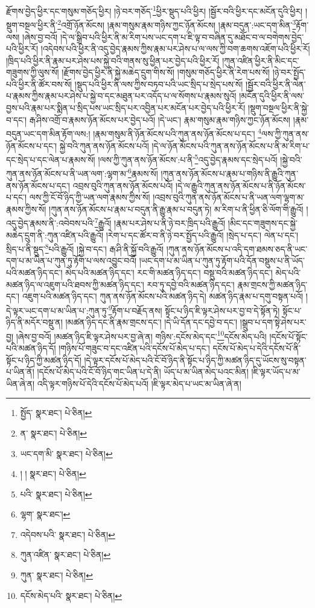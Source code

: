 རྫོགས་བྱེད་ཕྱིར་དང་གསུམ་གཅོད་ཕྱིར། །ཉེ་བར་གཅོད་\footnote{སྤྱོད་  སྣར་ཐང་།  པེ་ཅིན། }ཕྱིར་སྡུད་པའི་ཕྱིར། །སྦྱོར་བའི་ཕྱིར་དང་མངོན་དུའི་ཕྱིར། །སྡུག་བསྔལ་ཕྱིར་ནི་\footnote{ན་  སྣར་ཐང་།  པེ་ཅིན། }འགྲོ་ཉོན་མོངས། །རྣམ་གསུམ་རྣམ་གཉིས་ཀྱང་ཉོན་མོངས། །རྣམ་བདུན་:ཡང་དག་མིན་\footnote{ཡང་དག་མི་  སྣར་ཐང་།  པེ་ཅིན། }རྟོག་ལས། །ཞེས་བྱ་བའོ། །དེ་ལ་སྒྲིབ་པའི་ཕྱིར་ནི་མ་རིག་པས་ཡང་དག་པ་ཇི་ལྟ་བ་བཞིན་དུ་མཐོང་བ་ལ་བགེགས་བྱེད་པའི་ཕྱིར་རོ། །འདེབས་པའི་ཕྱིར་ནི་འདུ་བྱེད་རྣམས་ཀྱིས་རྣམ་པར་ཤེས་པ་ལ་ལས་ཀྱི་བག་ཆགས་འཇོག་པའི་ཕྱིར་རོ། །ཁྲིད་པའི་ཕྱིར་ནི་རྣམ་པར་ཤེས་པས་སྐྱེ་བའི་གནས་སུ་ཕྱིན་པར་བྱེད་པའི་ཕྱིར་རོ། །ཀུན་འཛིན་ཕྱིར་ནི་མིང་དང་གཟུགས་ཀྱི་ལུས་སོ། །རྫོགས་བྱེད་ཕྱིར་ནི་སྐྱེ་མཆེད་དྲུག་གིས་སོ། །གསུམ་གཅོད་ཕྱིར་ནི་རེག་པས་སོ། །ཉེ་བར་སྤྱོད་པའི་ཕྱིར་ནི་ཚོར་བས་སོ། །སྡུད་པའི་ཕྱིར་ནི་ལས་ཀྱིས་བཏབ་པའི་ཡང་སྲིད་པ་སྲེད་པས་སོ། །སྦྱོར་བའི་ཕྱིར་ནི་ལེན་པ་རྣམས་ཀྱིས་རྣམ་པར་ཤེས་པ་སྐྱེ་བ་དང་མཐུན་པར་འདོད་པ་ལ་སོགས་པ་རྣམས་སུའོ། །མངོན་དུའི་ཕྱིར་ནི་ལས་བྱས་པའི་རྣམ་པར་སྨིན་པ་སྲིད་པས་ཡང་སྲིད་པར་འབྱིན་པར་མངོན་པར་བྱེད་པའི་ཕྱིར་རོ། །སྡུག་བསྔལ་ཕྱིར་ནི་སྐྱེ་བ་དང་། རྒ་ཤིས་འགྲོ་བ་རྣམས་ཉོན་མོངས་པར་བྱེད་པའོ། །དེ་ཡང་། རྣམ་གསུམ་རྣམ་གཉིས་ཀྱང་ཉོན་མོངས། །རྣམ་བདུན་ཡང་དག་མིན་རྟོག་ལས:། །རྣམ་གསུམ་ནི་ཉོན་མོངས་པའི་ཀུན་ནས་ཉོན་མོངས་པ་དང་། \footnote{། །   སྣར་ཐང་།  པེ་ཅིན། }ལས་ཀྱི་ཀུན་ནས་ཉོན་མོངས་པ་དང་། སྐྱེ་བའི་ཀུན་ནས་ཉོན་མོངས་པའོ། །དེ་ལ་ཉོན་མོངས་པའི་ཀུན་ནས་ཉོན་མོངས་པ་ནི་མ་རིག་པ་དང་སྲེད་པ་དང་ལེན་པ་རྣམས་སོ། །ལས་ཀྱི་ཀུན་ནས་ཉོན་མོངས་:པ་ནི་\footnote{པའི་  སྣར་ཐང་།  པེ་ཅིན། }འདུ་བྱེད་རྣམས་དང་སྲེད་པའོ། །སྐྱེ་བའི་ཀུན་ནས་ཉོན་མོངས་པ་ནི་ཡན་ལག་:ལྷག་མ་\footnote{ལྷག་  སྣར་ཐང་། }རྣམས་སོ། །ཀུན་ནས་ཉོན་མོངས་པ་རྣམ་པ་གཉིས་ནི་རྒྱུའི་ཀུན་ནས་ཉོན་མོངས་པ་དང་། འབྲས་བུའི་ཀུན་ནས་ཉོན་མོངས་པའོ། །དེ་ལ་རྒྱུའི་ཀུན་ནས་ཉོན་མོངས་པ་ནི་ཉོན་མོངས་པ་དང་། ལས་ཀྱི་ངོ་བོ་ཉིད་ཀྱི་ཡན་ལག་རྣམས་ཀྱིས་སོ། །འབྲས་བུའི་ཀུན་ནས་ཉོན་མོངས་པ་ནི་ཡན་ལག་ལྷག་མ་རྣམས་ཀྱིས་སོ། །ཀུན་ནས་ཉོན་མོངས་པ་རྣམ་པ་བདུན་ནི་རྒྱུ་རྣམ་པ་བདུན་ཏེ། མ་རིག་པ་ནི་ཕྱིན་ཅི་ལོག་གི་རྒྱུའོ། །འདུ་བྱེད་རྣམས་ནི་:འབེབས་པའི་\footnote{འདེབས་པའི་  སྣར་ཐང་།  པེ་ཅིན། }རྒྱུའོ། །རྣམ་པར་ཤེས་པ་ནི་ཉེ་བར་ཁྲིད་པའི་རྒྱུའོ། །མིང་དང་གཟུགས་དང་སྐྱེ་མཆེད་དྲུག་ནི་:ཀུན་འཛིན་པའི་རྒྱུའོ། །རེག་པ་དང་ཚོར་བ་ནི་ཉེ་བར་སྤྱོད་པའི་རྒྱུའོ། །སྲེད་པ་དང་། ལེན་པ་དང་། སྲིད་པ་ནི་སྡུད་\footnote{ཀུན་འཛིན་  སྣར་ཐང་།  པེ་ཅིན། }པའི་རྒྱུའོ། །སྐྱེ་བ་དང་། རྒ་ཤི་ནི་སྐྱོ་བའི་རྒྱུའོ། །ཀུན་ནས་ཉོན་མོངས་པ་འདི་དག་ཐམས་ཅད་ནི་ཡང་དག་པ་མ་ཡིན་པ་ཀུན་ཏུ་རྟོག་པ་ལས་འབྱུང་བའོ། །ཡང་དག་པ་མ་ཡིན་པ་ཀུན་ཏུ་རྟོག་པའི་དོན་བསྡུས་པ་ནི་ཡོད་པའི་མཚན་ཉིད་དང་། མེད་པའི་མཚན་ཉིད་དང་། རང་གི་མཚན་ཉིད་དང་། བསྡུ་བའི་མཚན་ཉིད་དང་། མེད་པའི་མཚན་ཉིད་ལ་འཇུག་པའི་ཐབས་ཀྱི་མཚན་ཉིད་དང་། རབ་ཏུ་དབྱེ་བའི་མཚན་ཉིད་དང་། རྣམ་གྲངས་ཀྱི་མཚན་ཉིད་དང་། འཇུག་པའི་མཚན་ཉིད་དང་། ཀུན་ནས་ཉོན་མོངས་པའི་མཚན་ཉིད་དེ། མཚན་ཉིད་རྣམ་པ་དགུ་བསྟན་པའོ། །དེ་ལྟར་ཡང་དག་པ་མ་ཡིན་པ་:ཀུན་ཏུ་\footnote{ཀུན་  སྣར་ཐང་།  པེ་ཅིན། }རྟོག་པ་བརྗོད་ནས། སྟོང་པ་ཉིད་ཇི་ལྟར་ཤེས་པར་བྱ་བ་དེ་སྟོན་ཏེ། སྟོང་པ་ཉིད་ནི་མདོར་བསྡུ་ན། །མཚན་ཉིད་དང་ནི་རྣམ་གྲངས་དང་། །དེ་ཡི་དོན་དང་དབྱེ་བ་དང་། །སྒྲུབ་པ་དག་སྟེ་ཤེས་པར་བྱ། །ཞེས་བྱ་བའོ། །མཚན་ཉིད་ཇི་ལྟར་ཤེས་པར་བྱ་ཞེ་ན། གཉིས་:དངོས་མེད་དང་\footnote{དངོས་མེད་པའི་  སྣར་ཐང་།  པེ་ཅིན། }དངོས་མེད་པའི། །དངོས་པོ་སྟོང་པའི་མཚན་ཉིད་དོ། །གཉིས་པོ་གཟུང་བ་དང་འཛིན་པའི་དངོས་པོ་མེད་པ་དང་། དངོས་པོ་མེད་པ་དེའི་དངོས་པོ་ནི་སྟོང་པ་ཉིད་ཀྱི་མཚན་ཉིད་དོ། །དེ་ལྟར་དངོས་པོ་མེད་པའི་ངོ་བོ་ཉིད་ནི་སྟོང་པ་ཉིད་ཀྱི་མཚན་ཉིད་དུ་ཡོངས་སུ་བསྟན་པ་ཡིན་ནོ། །དངོས་པོ་མེད་པའི་ངོ་བོ་ཉིད་གང་ཡིན་པ་དེ་ནི། ཡོད་པ་མ་ཡིན་མེད་པའང་མིན། །ཇི་ལྟར་ཡོད་པ་མ་ཡིན་ཞེ་ན། འདི་ལྟར་གཉིས་པོ་དེའི་དངོས་པོ་མེད་པའོ། །ཇི་ལྟར་མེད་པ་ཡང་མ་ཡིན་ཞེ་ན། 